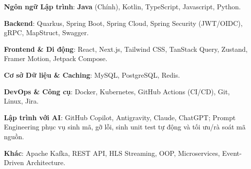 \begin{cvempty} %
    \begin{cvitems} %
        \item{\textbf{Ngôn ngữ Lập trình}: \textbf{Java} (Chính), Kotlin, TypeScript, Javascript, Python.}
        \item{\textbf{Backend}: Quarkus, Spring Boot, Spring Cloud, Spring Security (JWT/OIDC), gRPC, MapStruct, Swagger.}
        \item{\textbf{Frontend \& Di động}: React, Next.js, Tailwind CSS, TanStack Query, Zustand, Framer Motion, Jetpack Compose.}
        \item{\textbf{Cơ sở Dữ liệu \& Caching}: MySQL, PostgreSQL, Redis.}
        \item{\textbf{DevOps \& Công cụ}: Docker, Kubernetes, GitHub Actions (CI/CD), Git, Linux, Jira.}
        \item{\textbf{Lập trình với AI}: GitHub Copilot, Antigravity, Claude, ChatGPT; Prompt Engineering phục vụ sinh mã, gỡ lỗi, sinh unit test tự động và tối ưu/rà soát mã nguồn.}
        \item{\textbf{Khác}: Apache Kafka, REST API, HLS Streaming, OOP, Microservices, Event-Driven Architecture.}
    \end{cvitems}
\end{cvempty}
